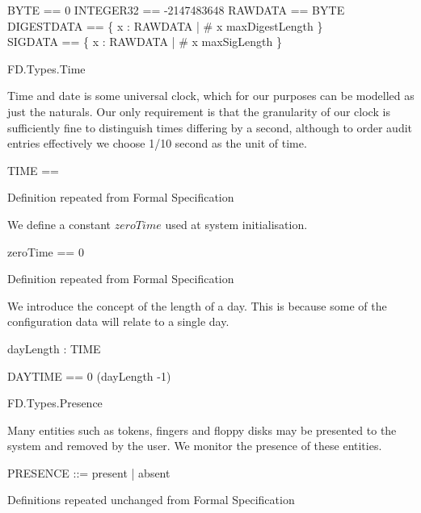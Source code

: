 \begin{zed}
        BYTE == 0 
\also
        INTEGER32 == -2147483648 
\also 
        RAWDATA == \seq BYTE
\also 
        DIGESTDATA == \{ x : RAWDATA | \# x \leq maxDigestLength \}
\\      SIGDATA == \{ x : RAWDATA | \# x \leq maxSigLength \}
\end{zed}
        


\begin{traceunit}{FD.Types.Time}
\end{traceunit}

Time and date is some universal clock,
which for our purposes can be modelled as just the naturals. Our only
requirement is that the granularity of our clock is sufficiently fine
to distinguish times differing by a second, although to order audit
entries effectively we choose 1/10 second as the unit of time. 
\begin{zed}
	TIME == \nat
\end{zed}
\begin{Zcomment}
\item Definition repeated from Formal Specification \cite{FS}
\end{Zcomment}

We define a constant $zeroTime$ used at system initialisation.

\begin{zed}
        zeroTime == 0
\end{zed}
\begin{Zcomment}
\item Definition repeated from Formal Specification \cite{FS}
\end{Zcomment}

We introduce the concept of the length of a day. This is because some
of the configuration data will relate to a single day.

\begin{axdef}
        dayLength : TIME
\end{axdef}

\begin{zed}
        DAYTIME == 0 \upto (dayLength -1)
\end{zed}

\begin{traceunit}{FD.Types.Presence}
\end{traceunit}

Many entities such as tokens, fingers and floppy disks may be
presented to the system and removed by the user. We monitor the
presence of these entities.
\begin{zed}
	PRESENCE ::= present | absent
\end{zed}
\begin{Zcomment}
\item Definitions repeated unchanged from Formal Specification \cite{FS}
\end{Zcomment}

